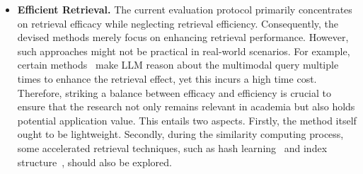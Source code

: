 \begin{itemize}
    \item \textbf{Efficient Retrieval.} The current evaluation protocol primarily concentrates on retrieval efficacy while neglecting retrieval efficiency. Consequently, the devised methods merely focus on enhancing retrieval performance. However, such approaches might not be practical in real-world scenarios. For example, certain methods~\cite{ldre, seize} make LLM reason about the multimodal query multiple times to enhance the retrieval effect, yet this incurs a high time cost. Therefore, striking a balance between efficacy and efficiency is crucial to ensure that the research not only remains relevant in academia but also holds potential application value. This entails two aspects. Firstly, the method itself ought to be lightweight. Secondly, during the similarity computing process, some accelerated retrieval techniques, such as hash learning~\cite{hash} and index structure~\cite{index}, should also be explored.
    
   


\end{itemize}
